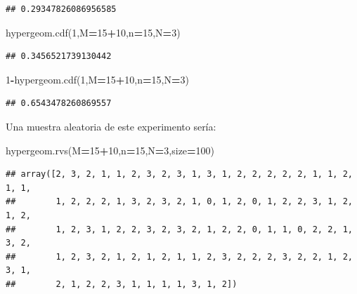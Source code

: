 \documentclass[]{book}
\newenvironment{Shaded}{\begin{snugshade}}{\end{snugshade}}
\newcommand{\DecValTok}[1]{\textcolor[rgb]{0.00,0.00,0.81}{#1}}
\newcommand{\NormalTok}[1]{#1}
\newcommand{\OperatorTok}[1]{\textcolor[rgb]{0.81,0.36,0.00}{\textbf{#1}}}
\begin{document}
\begin{verbatim}
## 0.29347826086956585
\end{verbatim}

\begin{Shaded}
\begin{Highlighting}[]
\NormalTok{hypergeom.cdf(}\DecValTok{1}\NormalTok{,M}\OperatorTok{=}\DecValTok{15}\OperatorTok{+}\DecValTok{10}\NormalTok{,n}\OperatorTok{=}\DecValTok{15}\NormalTok{,N}\OperatorTok{=}\DecValTok{3}\NormalTok{)}
\end{Highlighting}
\end{Shaded}

\begin{verbatim}
## 0.3456521739130442
\end{verbatim}

\begin{Shaded}
\begin{Highlighting}[]
\DecValTok{1}\OperatorTok{-}\NormalTok{hypergeom.cdf(}\DecValTok{1}\NormalTok{,M}\OperatorTok{=}\DecValTok{15}\OperatorTok{+}\DecValTok{10}\NormalTok{,n}\OperatorTok{=}\DecValTok{15}\NormalTok{,N}\OperatorTok{=}\DecValTok{3}\NormalTok{)}
\end{Highlighting}
\end{Shaded}

\begin{verbatim}
## 0.6543478260869557
\end{verbatim}

Una muestra aleatoria de este experimento sería:

\begin{Shaded}
\begin{Highlighting}[]
\NormalTok{hypergeom.rvs(M}\OperatorTok{=}\DecValTok{15}\OperatorTok{+}\DecValTok{10}\NormalTok{,n}\OperatorTok{=}\DecValTok{15}\NormalTok{,N}\OperatorTok{=}\DecValTok{3}\NormalTok{,size}\OperatorTok{=}\DecValTok{100}\NormalTok{)}
\end{Highlighting}
\end{Shaded}

\begin{verbatim}
## array([2, 3, 2, 1, 1, 2, 3, 2, 3, 1, 3, 1, 2, 2, 2, 2, 2, 1, 1, 2, 1, 1,
##        1, 2, 2, 2, 1, 3, 2, 3, 2, 1, 0, 1, 2, 0, 1, 2, 2, 3, 1, 2, 1, 2,
##        1, 2, 3, 1, 2, 2, 3, 2, 3, 2, 1, 2, 2, 0, 1, 1, 0, 2, 2, 1, 3, 2,
##        1, 2, 3, 2, 1, 2, 1, 2, 1, 1, 2, 3, 2, 2, 2, 3, 2, 2, 1, 2, 3, 1,
##        2, 1, 2, 2, 3, 1, 1, 1, 1, 3, 1, 2])
\end{verbatim}
\end{document}
